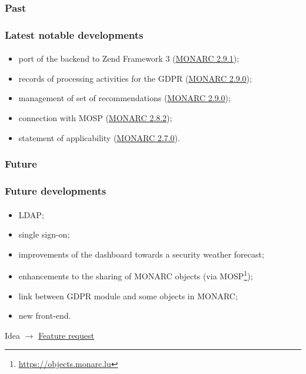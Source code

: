 \subsubsection{Past}
\begin{frame}
    \frametitle{Latest notable developments}
    \framesubtitle{}
    \begin{itemize}
        \item port of the backend to Zend Framework 3 (\href{https://www.monarc.lu/news/2019/11/25/monarc-291-released/}{MONARC 2.9.1});
        \item records of processing activities for the GDPR (\href{https://www.monarc.lu/news/2019/08/23/monarc-290-released/}{MONARC 2.9.0});
        \item management of set of recommendations (\href{https://www.monarc.lu/news/2019/08/23/monarc-290-released/}{MONARC 2.9.0});
        \item connection with MOSP (\href{https://www.monarc.lu/news/2019/05/28/monarc-282-released/}{MONARC 2.8.2});
        \item statement of applicability (\href{https://www.monarc.lu/news/2018/08/22/monarc-270-released/}{MONARC 2.7.0}).
    \end{itemize}
\end{frame}

\subsubsection{Future}
\begin{frame}
    \frametitle{Future developments}
    \framesubtitle{}
    \begin{itemize}
        \item LDAP;
        \item single sign-on;
        \item improvements of the dashboard towards a security weather forecast;
        \item enhancements to the sharing of MONARC objects (via MOSP\footnote{\url{https://objects.monarc.lu}});
        \item link between GDPR module and some objects in MONARC;
        \item new front-end.
    \end{itemize}
    \bigskip
    Idea
    $\rightarrow$
    \href{https://github.com/monarc-project/MonarcAppFO/issues/new?labels=feature+request}{Feature request}
\end{frame}

